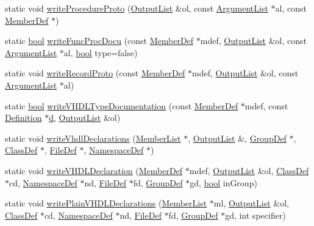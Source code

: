 \begin{DoxyCompactItemize}
\item 
static void \hyperlink{class_vhdl_doc_gen_a94da80078b9bba291b1c1af056eca6a4}{write\+Procedure\+Proto} (\hyperlink{class_output_list}{Output\+List} \&ol, const \hyperlink{class_argument_list}{Argument\+List} $\ast$al, const \hyperlink{class_member_def}{Member\+Def} $\ast$)
\item 
static \hyperlink{qglobal_8h_a1062901a7428fdd9c7f180f5e01ea056}{bool} \hyperlink{class_vhdl_doc_gen_a8c40c856602e19b4fe421c9572d618b7}{write\+Func\+Proc\+Docu} (const \hyperlink{class_member_def}{Member\+Def} $\ast$mdef, \hyperlink{class_output_list}{Output\+List} \&ol, const \hyperlink{class_argument_list}{Argument\+List} $\ast$al, \hyperlink{qglobal_8h_a1062901a7428fdd9c7f180f5e01ea056}{bool} type=false)
\item 
static void \hyperlink{class_vhdl_doc_gen_a4be0e9c1867f4bdc5a06f1ca54905d4b}{write\+Record\+Proto} (const \hyperlink{class_member_def}{Member\+Def} $\ast$mdef, \hyperlink{class_output_list}{Output\+List} \&ol, const \hyperlink{class_argument_list}{Argument\+List} $\ast$al)
\item 
static \hyperlink{qglobal_8h_a1062901a7428fdd9c7f180f5e01ea056}{bool} \hyperlink{class_vhdl_doc_gen_a0218e5158efa51df8490073c645c9a79}{write\+V\+H\+D\+L\+Type\+Documentation} (const \hyperlink{class_member_def}{Member\+Def} $\ast$mdef, const \hyperlink{class_definition}{Definition} $\ast$\hyperlink{060__command__switch_8tcl_af43f4b1f0064a33b2d662af9f06d3a00}{d}, \hyperlink{class_output_list}{Output\+List} \&ol)
\item 
static void \hyperlink{class_vhdl_doc_gen_a26d6d3e1a28067a7a5c9f8624f642654}{write\+Vhdl\+Declarations} (\hyperlink{class_member_list}{Member\+List} $\ast$, \hyperlink{class_output_list}{Output\+List} \&, \hyperlink{class_group_def}{Group\+Def} $\ast$, \hyperlink{class_class_def}{Class\+Def} $\ast$, \hyperlink{class_file_def}{File\+Def} $\ast$, \hyperlink{class_namespace_def}{Namespace\+Def} $\ast$)
\item 
static void \hyperlink{class_vhdl_doc_gen_ac5c7235e2572f9dab6475d5af835e437}{write\+V\+H\+D\+L\+Declaration} (\hyperlink{class_member_def}{Member\+Def} $\ast$mdef, \hyperlink{class_output_list}{Output\+List} \&ol, \hyperlink{class_class_def}{Class\+Def} $\ast$cd, \hyperlink{class_namespace_def}{Namespace\+Def} $\ast$nd, \hyperlink{class_file_def}{File\+Def} $\ast$fd, \hyperlink{class_group_def}{Group\+Def} $\ast$gd, \hyperlink{qglobal_8h_a1062901a7428fdd9c7f180f5e01ea056}{bool} in\+Group)
\item 
static void \hyperlink{class_vhdl_doc_gen_ae7a0bfaf11295ea18c656b14fb54203a}{write\+Plain\+V\+H\+D\+L\+Declarations} (\hyperlink{class_member_list}{Member\+List} $\ast$ml, \hyperlink{class_output_list}{Output\+List} \&ol, \hyperlink{class_class_def}{Class\+Def} $\ast$cd, \hyperlink{class_namespace_def}{Namespace\+Def} $\ast$nd, \hyperlink{class_file_def}{File\+Def} $\ast$fd, \hyperlink{class_group_def}{Group\+Def} $\ast$gd, int specifier)

\end{DoxyCompactItemize}
